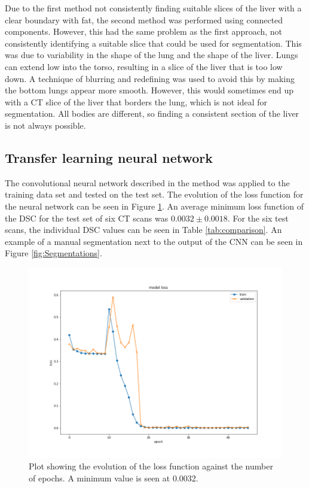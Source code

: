 \documentclass[12pt]{article}
\begin{document}
Due to the first method not consistently finding suitable slices of the liver with a clear boundary with fat, the second method was performed using connected components. However, this had the same problem as the first approach, not consistently identifying a suitable slice that could be used for segmentation. This was due to variability in the shape of the lung and the shape of the liver. Lungs can extend low into the torso, resulting in a slice of the liver that is too low down. A technique of blurring and redefining was used to avoid this by making the bottom lungs appear more smooth. However, this would sometimes end up with a CT slice of the liver that borders the lung, which is not ideal for segmentation. All bodies are different, so finding a consistent section of the liver is not always possible.


\subsection{Transfer learning neural network}

\color{black}
The convolutional neural network described in the method was applied to the training data set and tested on the test set. The evolution of the loss function for the neural network can be seen in Figure \ref{fig:loss_function}. An average minimum loss function of the DSC for the test set of six CT scans was \hbox{$0.0032\pm0.0018$}. For the six test scans, the individual DSC values can be seen in Table \ref{tab:comparison}. An example of a manual segmentation next to the output of the CNN can be seen in Figure \ref{fig:Segmentations}.

\begin{figure}[htp]
    \centering
    \includegraphics[width=0.8\linewidth]{graphics/LossGraph.png}
    \caption{Plot showing the evolution of the loss function against the number of epochs. A minimum value is seen at 0.0032.}
    \label{fig:loss_function}
\end{figure}
\end{document}
